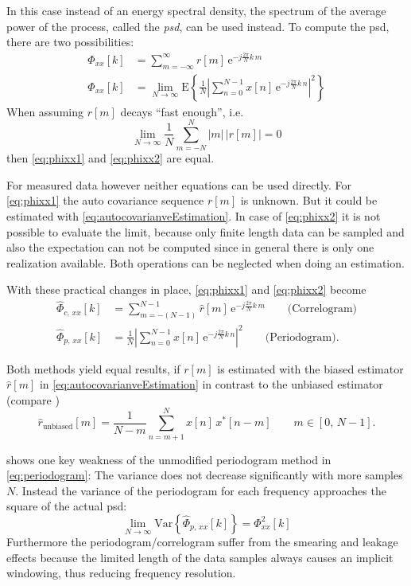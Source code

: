In this case instead of an energy spectral density, the spectrum of the average power of the process, called the \textit{\gls{psd}}, can be used instead.
To compute the \gls{psd}, there are two possibilities:
\begin{align}
\Phi_{xx}[k] &= \sum_{m=-\infty}^{\infty} r[m]\,\text{e}^{-j\frac{2\pi}{N}k\,m} \label{eq:phixx1}\\
\Phi_{xx}[k] &= \lim_{N\rightarrow\infty} \text{E}\left\{\frac{1}{N}\left|\sum_{n=0}^{N-1} x[n]\,\text{e}^{-j\frac{2\pi}{N}k\,n}\right|^2 \right\} \label{eq:phixx2}
\end{align}
When assuming $r[m]$ decays ``fast enough'', i.e.
\begin{equation}
\lim_{N\rightarrow\infty} \frac{1}{N} \sum_{m=-N}^{N} |m|\,\left|r[m]\right| = 0
\end{equation}
then \autoref{eq:phixx1} and \autoref{eq:phixx2} are equal. \cite[p.~7]{Stoica1997}

For measured data however neither equations can be used directly.
For \autoref{eq:phixx1} the auto covariance sequence $r[m]$ is unknown.
But it could be estimated with \autoref{eq:autocovarianveEstimation}. In case of \autoref{eq:phixx2} it is not possible to evaluate the limit, because only finite length data can be sampled and also the expectation can not be computed since in general there is only one realization available. Both operations can be neglected when doing an estimation.

With these practical changes in place, \autoref{eq:phixx1} and \autoref{eq:phixx2} become
\begin{align}
\hat{\Phi}_{c,\,xx}[k] &= \sum_{m=-(N-1)}^{N-1} \hat{r}[m]\,\text{e}^{-j\frac{2\pi}{N}k\,m} \label{eq:phiCxx1}\qquad\text{(Correlogram)}\\
\hat{\Phi}_{p,\,xx}[k] &= \frac{1}{N} \left| \sum_{n=0}^{N-1} x[n]\,\text{e}^{-j\frac{2\pi}{N}k\,n}\right|^2\qquad\text{(Periodogram)}\label{eq:periodogram}.
\end{align}

Both methods yield equal results, if $r[m]$ is estimated with the biased estimator $\hat{r}[m]$ in \autoref{eq:autocovarianveEstimation} in contrast to the unbiased estimator (compare \cite[p.~24]{Stoica1997})
\begin{equation}
\hat{r}_{\text{unbiased}}[m] = \frac{1}{N-m} \sum_{n=m+1}^{N} x[n]\,x^\ast[n-m]\qquad m \in [0,\,N-1].
\end{equation}

\cite{Rowell2008} shows one key weakness of the unmodified periodogram method in \autoref{eq:periodogram}: The variance does not decrease significantly with more samples $N$. Instead the variance of the periodogram for each frequency approaches the square of the actual \gls{psd}:
\begin{equation}
\lim_{N\rightarrow\infty} \text{Var}\left\{\hat{\Phi}_{p,\,xx}[k]\right\} = \Phi_{xx}^2[k]
\end{equation}
Furthermore the periodogram/correlogram suffer from the smearing and leakage effects because the limited length of the data samples always causes an implicit windowing, thus reducing frequency resolution.\\

